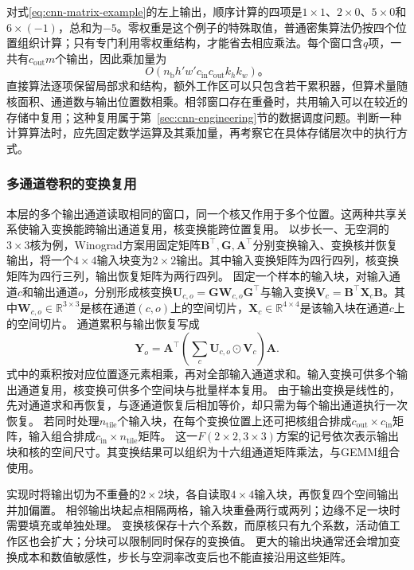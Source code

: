 对式\eqref{eq:cnn-matrix-example}的左上输出，顺序计算的四项是$1\times1$、$2\times0$、$5\times0$和$6\times(-1)$，总和为$-5$。零权重是这个例子的特殊取值，普通密集算法仍按四个位置组织计算；只有专门利用零权重结构，才能省去相应乘法。每个窗口含$q$项，一共有$c_{\mathrm{out}}m$个输出，因此乘加量为
\begin{equation}
  O\!\left(n_{\mathrm b}h'w'c_{\mathrm{in}}c_{\mathrm{out}}k_hk_w\right)\text{。}
  \label{eq:cnn-direct-cost}
\end{equation}
直接算法逐项保留局部求和结构，额外工作区可以只包含若干累积器，但算术量随核面积、通道数与输出位置数相乘。相邻窗口存在重叠时，共用输入可以在较近的存储中复用；这种复用属于第~\ref{sec:cnn-engineering}节的数据调度问题。判断一种计算算法时，应先固定数学运算及其乘加量，再考察它在具体存储层次中的执行方式。

\subsubsection{多通道卷积的变换复用}
\label{sec:cnn-transform-reuse}

本层的多个输出通道读取相同的窗口，同一个核又作用于多个位置。这两种共享关系使输入变换能跨输出通道复用，核变换能跨位置复用。
以步长一、无空洞的$3\times3$核为例，Winograd方案用固定矩阵$\bm B^\top,\bm G,\bm A^\top$分别变换输入、变换核并恢复输出，将一个$4\times4$输入块变为$2\times2$输出。其中输入变换矩阵为四行四列，核变换矩阵为四行三列，输出恢复矩阵为两行四列。
固定一个样本的输入块，对输入通道$c$和输出通道$o$，分别形成核变换$\bm U_{c,o}=\bm G\bm W_{c,o}\bm G^\top$与输入变换$\bm V_c=\bm B^\top\bm X_c\bm B$。其中$\bm W_{c,o}\in\mathbb R^{3\times3}$是核在通道$(c,o)$上的空间切片，$\bm X_c\in\mathbb R^{4\times4}$是该输入块在通道$c$上的空间切片。
通道累积与输出恢复写成
\begin{equation}
 \bm Y_o=\bm A^\top\left(\sum_c\bm U_{c,o}\odot\bm V_c\right)\bm A.
 \label{eq:cnn-winograd-channel-reuse}
\end{equation}
式中的乘积按对应位置逐元素相乘，再对全部输入通道求和。输入变换可供多个输出通道复用，核变换可供多个空间块与批量样本复用。
由于输出变换是线性的，先对通道求和再恢复，与逐通道恢复后相加等价，却只需为每个输出通道执行一次恢复。
若同时处理$n_{\mathrm{tile}}$个输入块，在每个变换位置上还可把核组合排成$c_{\mathrm{out}}\times c_{\mathrm{in}}$矩阵，输入组合排成$c_{\mathrm{in}}\times n_{\mathrm{tile}}$矩阵。
这一$F(2\times2,3\times3)$方案的记号依次表示输出块和核的空间尺寸。其变换结果可以组织为十六组通道矩阵乘法，与GEMM组合使用。

实现时将输出切为不重叠的$2\times2$块，各自读取$4\times4$输入块，再恢复四个空间输出并加偏置。
相邻输出块起点相隔两格，输入块重叠两行或两列；边缘不足一块时需要填充或单独处理。
变换核保存十六个系数，而原核只有九个系数，活动值工作区也会扩大；分块可以限制同时保存的变换值。
更大的输出块通常还会增加变换成本和数值敏感性，步长与空洞率改变后也不能直接沿用这些矩阵。

